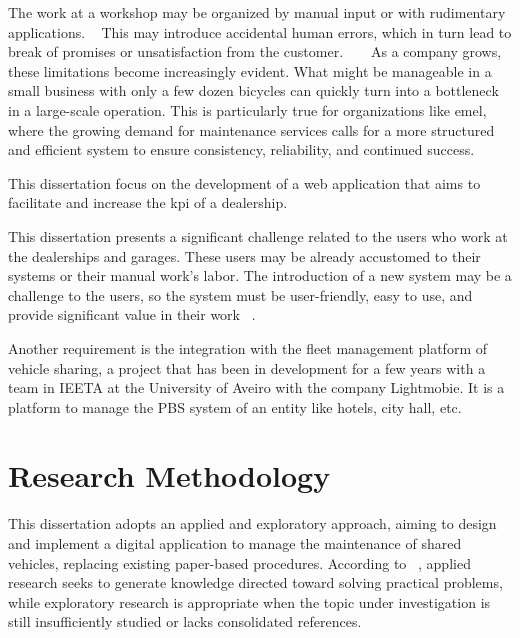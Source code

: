 The work at a workshop may be organized by manual input or with rudimentary applications. ~\cite{MAS_MOTORS} 
This may introduce accidental human errors, which in turn lead to break of promises or unsatisfaction from the customer. ~\cite{MAS_MOTORS} ~\cite{Setting_the_after_sale_process}
As a company grows, these limitations become increasingly evident. What might be manageable in a small business with only a few dozen bicycles can quickly turn into a bottleneck in a large-scale operation. This is particularly true for organizations like \acs{emel}, where the growing demand for maintenance services calls for a more structured and efficient system to ensure consistency, reliability, and continued success.


This dissertation focus on the development of a web application that aims to facilitate and increase the \acs{kpi} of a dealership. 

This dissertation presents a significant challenge related to the users who work at the dealerships and garages. 
These users may be already accustomed to their systems or their manual work's labor.   
The introduction of a new system may be a challenge to the users, so the system must be user-friendly, easy to use, and provide significant value in their work ~\cite{ALI201635, Cieslak_2025}.

Another requirement is the integration with the fleet management platform of vehicle sharing, a project that has been in development for a few years with a team in \ac{IEETA} at the University of Aveiro with the company Lightmobie.
It is a platform to manage the \acs{PBS} system of an entity like hotels, city hall, etc.  

\section{Research Methodology}
\label{sec:methodology}

This dissertation adopts an applied and exploratory approach, aiming to design and implement a digital application to manage the maintenance of shared vehicles, replacing existing paper-based procedures. According to ~\citet{Gil_2008}, applied research seeks to generate knowledge directed toward solving practical problems, while exploratory research is appropriate when the topic under investigation is still insufficiently studied or lacks consolidated references.

